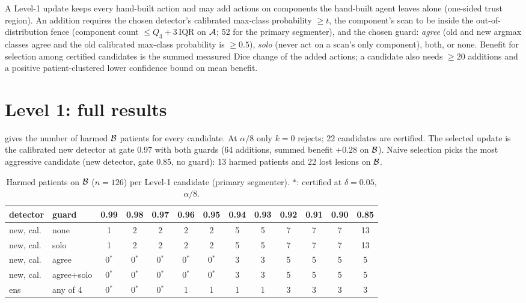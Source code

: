 A Level-1 update keeps every hand-built action and may add actions on components the hand-built agent leaves alone (one-sided trust region). An addition requires the chosen detector's calibrated max-class probability $\ge t$, the component's scan to be inside the out-of-distribution fence (component count $\le Q_3+3\,\mathrm{IQR}$ on $\mathcal{A}$; 52 for the primary segmenter), and the chosen guard: \emph{agree} (old and new argmax classes agree and the old calibrated max-class probability is $\ge0.5$), \emph{solo} (never act on a scan's only component), both, or none.
Benefit for selection among certified candidates is the summed measured Dice change of the added actions; a candidate also needs $\ge20$ additions and a positive patient-clustered lower confidence bound on mean benefit.

\section{Level 1: full results}
\label{sec:supp_level1}

  gives the number of harmed $\mathcal{B}$ patients for every candidate. At $\alpha/8$ only $k=0$ rejects; 22 candidates are certified. The selected update is the calibrated new detector at gate 0.97 with both guards (64 additions, summed benefit $+0.28$ on $\mathcal{B}$). Naive selection picks the most aggressive candidate (new detector, gate 0.85, no guard): 13 harmed patients and 22 lost lesions on $\mathcal{B}$.

\begin{table}[t]
\centering
\caption{Harmed patients on $\mathcal{B}$ ($n=126$) per Level-1 candidate (primary segmenter). $\ast$: certified at $\delta=0.05$, $\alpha/8$.}
\label{tab:supp_chains}
\footnotesize
\setlength{\tabcolsep}{4pt}
\begin{tabular}{@{}llccccccccccc@{}}
\toprule
detector & guard & 0.99 & 0.98 & 0.97 & 0.96 & 0.95 & 0.94 & 0.93 & 0.92 & 0.91 & 0.90 & 0.85 \\
\midrule
new, cal. & none & 1 & 2 & 2 & 2 & 2 & 5 & 5 & 7 & 7 & 7 & 13 \\
new, cal. & solo & 1 & 2 & 2 & 2 & 2 & 5 & 5 & 7 & 7 & 7 & 13 \\
new, cal. & agree & 0$^\ast$ & 0$^\ast$ & 0$^\ast$ & 0$^\ast$ & 0$^\ast$ & 3 & 3 & 5 & 5 & 5 & 5 \\
new, cal. & agree+solo & 0$^\ast$ & 0$^\ast$ & 0$^\ast$ & 0$^\ast$ & 0$^\ast$ & 3 & 3 & 5 & 5 & 5 & 5 \\
ens & any of 4 & 0$^\ast$ & 0$^\ast$ & 0$^\ast$ & 1 & 1 & 1 & 1 & 3 & 3 & 3 & 3 \\
\bottomrule
\end{tabular}
\end{table}

